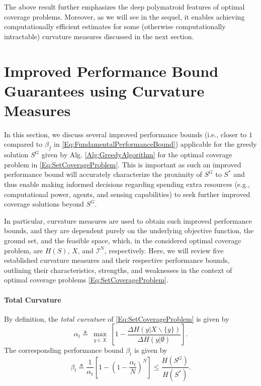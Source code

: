 \documentclass[letterpaper, 10 pt, conference]{ieeeconf}
\begin{document}


The above result further emphasizes the deep polymatroid features of optimal coverage problems. Moreover, as we will see in the sequel, it enables achieving computationally efficient estimates for some (otherwise computationally intractable) curvature measures discussed in the next section.


\section{Improved Performance Bound Guarantees using Curvature Measures}
\label{Sec:CurvatureMeasures}

In this section, we discuss several improved performance bounds (i.e., closer to $1$ compared to $\beta_f$ in \eqref{Eq:FundamentalPerformanceBound}) applicable for the greedy solution $S^G$ given by Alg. \ref{Alg:GreedyAlgorithm} for the optimal coverage problem in \eqref{Eq:SetCoverageProblem}.  
This is important as such an improved performance bound will accurately characterize the proximity of $S^G$ to $S^*$ and thus enable making informed decisions regarding spending extra resources (e.g., computational power, agents, and sensing capabilities) to seek further improved coverage solutions beyond $S^G$. 


In particular, curvature measures are used to obtain such improved performance bounds, and they are dependent purely on the underlying objective function, the ground set, and the feasible space, which, in the considered optimal coverage problem, are $H(S)$, $X$, and $\mathcal{I}^N$, respectively. Here, we will review five established curvature measures and their respective performance bounds, outlining their characteristics, strengths, and weaknesses in the context of optimal coverage problems \eqref{Eq:SetCoverageProblem}. 


\paragraph{\textbf{Total Curvature \cite{Conforti1984}}}
By definition, the \emph{total curvature} of \eqref{Eq:SetCoverageProblem} is given by  
\begin{equation}\label{Eq:TotalCurvatureCoefficientTheory}
    \alpha_t \triangleq \max_{\substack{y \in X} }\left[1 - \frac{\Delta H(y \vert X \backslash \{y\})}{\Delta H(y \vert \emptyset)}\right].
\end{equation}
The corresponding performance bound $\beta_t$ is given by
\begin{equation}\label{Eq:TotalCurvatureBoundTheory}
    \beta_t \triangleq \frac{1}{\alpha_t} \left[ 1 - \left( 1 -\frac{\alpha_t}{N} \right)^N \right] \leq \frac{H(S^G)}{H(S^*)}.
\end{equation}
\end{document}

